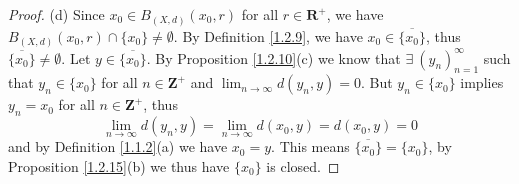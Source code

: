\begin{proof}{(d)}
    Since \(x_0 \in B_{(X, d)}(x_0, r)\) for all \(r \in \mathbf{R}^+\), we have \(B_{(X, d)}(x_0, r) \cap \{x_0\} \neq \emptyset\).
    By Definition \ref{1.2.9}, we have \(x_0 \in \overline{\{x_0\}}\), thus \(\overline{\{x_0\}} \neq \emptyset\).
    Let \(y \in \overline{\{x_0\}}\).
    By Proposition \ref{1.2.10}(c) we know that \(\exists\ (y_n)_{n = 1}^\infty\) such that \(y_n \in \{x_0\}\) for all \(n \in \mathbf{Z}^+\) and \(\lim_{n \to \infty} d(y_n, y) = 0\).
    But \(y_n \in \{x_0\}\) implies \(y_n = x_0\) for all \(n \in \mathbf{Z}^+\), thus
    \[
        \lim_{n \to \infty} d(y_n, y) = \lim_{n \to \infty} d(x_0, y) = d(x_0, y) = 0
    \]
    and by Definition \ref{1.1.2}(a) we have \(x_0 = y\).
    This means \(\overline{\{x_0\}} = \{x_0\}\), by Proposition \ref{1.2.15}(b) we thus have \(\{x_0\}\) is closed.
\end{proof}